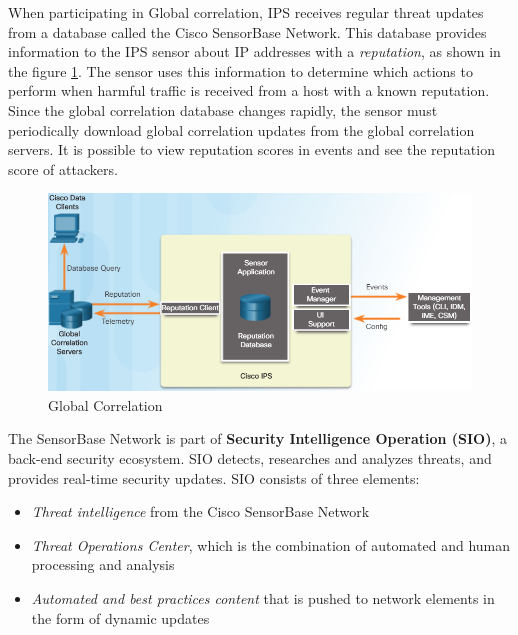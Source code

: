When participating in Global correlation, IPS receives regular threat updates from a database called the Cisco SensorBase Network. This database provides information to the IPS sensor about IP addresses with a \emph{reputation}, as shown in the figure \ref{GlobalCorrelation}. The sensor uses this information to determine which actions to perform when harmful traffic is received from a host with a known reputation. Since the global correlation database changes rapidly, the sensor must periodically download global correlation updates from the global correlation servers. It is possible to view reputation scores in events and see the reputation score of attackers.\\

\begin{figure}[hbtp]
\caption{Global Correlation}\label{GlobalCorrelation}
\centering
\includegraphics[scale=0.5]{pictures/GlobalCorrelation.PNG}
\end{figure}



The SensorBase Network is part of \textbf{Security Intelligence Operation (SIO)}, a back-end security ecosystem. SIO detects, researches and analyzes threats, and provides real-time security updates. SIO consists of three elements:

\begin{itemize}
\item \emph{Threat intelligence} from the Cisco SensorBase Network
\item \emph{Threat Operations Center}, which is the combination of automated and human processing and analysis
\item \emph{Automated and best practices content} that is pushed to network elements in the form of dynamic updates
\end{itemize}

